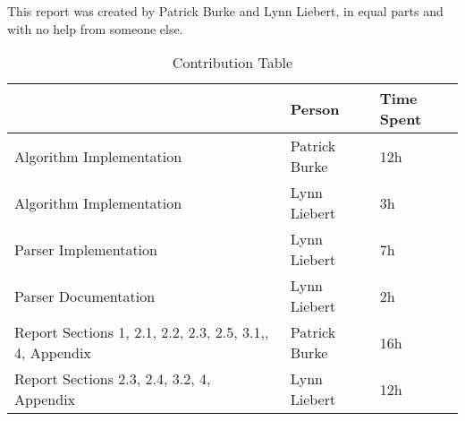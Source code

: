 This report was created by Patrick Burke and Lynn Liebert, in equal parts and with no help from someone else.

\vspace{2cm}
\vspace{2cm}

\vspace{7cm}

\begin{table}[H]
\centering
\caption*{Contribution Table}
\begin{tabular}{|p{5cm}|l|l|}
\hline
                         & Person        & Time Spent \\ \hline
Algorithm Implementation & Patrick Burke & 12h        \\ \hline
Algorithm Implementation & Lynn Liebert  & 3h         \\ \hline
Parser Implementation    & Lynn Liebert  & 7h         \\ \hline
Parser Documentation     & Lynn Liebert  & 2h         \\ \hline
Report Sections 1, 2.1,
2.2, 2.3, 2.5, 3.1,, 4,
Appendix                 & Patrick Burke & 16h        \\ \hline
Report Sections 2.3,
2.4, 3.2, 4, Appendix    & Lynn Liebert  & 12h        \\ \hline

\end{tabular}
\end{table}
